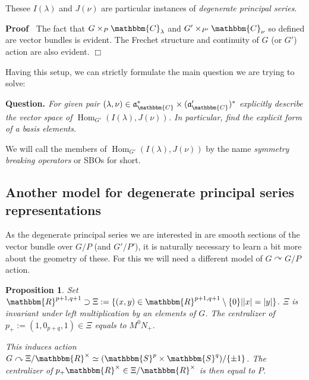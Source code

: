 \documentclass{article}
\newcommand{\assign}{:=}
\newcommand{\tmop}[1]{\ensuremath{\operatorname{#1}}}
\newcommand{\tmtextbf}[1]{{\bfseries{#1}}}
\newcommand{\tmtextit}[1]{{\itshape{#1}}}
\newenvironment{proof}{\noindent\textbf{Proof\ }}{\hspace*{\fill}$\Box$\medskip}
\numberwithin{definition}{section}
\numberwithin{lemma}{section}
\newtheorem{proposition}{Proposition}
\numberwithin{proposition}{section}
{\theorembodyfont{\rmfamily}\newtheorem{remark}{Remark}
\numberwithin{remark}{section}
}
\begin{document}
\begin{remark}
  Thesee $I ( \lambda)$ and $J ( \nu)$ are particular instances of
  \tmtextit{degenerate principal series}.
\end{remark}

\begin{proof}
  The fact that $G \times_P \mathbbm{C}_{\lambda}$ and $G' \times_{P'}
  \mathbbm{C}_{\nu}$ so defined are vector bundles is evident. The Frechet
  structure and continuity of $G$ (or $G'$) action are also evident.
\end{proof}

Having this setup, we can strictly formulate the main question we are trying
to solve:

{\noindent}\tmtextbf{Question. }\tmtextit{For given pair $( \lambda, \nu) \in
\mathfrak{a}_{\mathbbm{C}}^{\ast} \times (
\mathfrak{a}'_{\mathbbm{C}})^{\ast}$ explicitly describe the vector space of
$\tmop{Hom}_{G'} ( I ( \lambda), J ( \nu))$. In particular, find the explicit
form of a basis elements.}{\hspace*{\fill}}{\medskip}

\begin{remark}
  We will call the members of $\tmop{Hom}_{G'} ( I ( \lambda), J ( \nu))$ by
  the name \tmtextit{symmetry breaking operators} or SBOs for short.
\end{remark}

\subsection{Another model for degenerate principal series representations}

As the degenerate principal series we are interested in are smooth sections of
the vector bundle over $G / P$ (and $G' / P'$), it is naturally necessary to
learn a bit more about the geometry of these. For this we will need a
different model of $G \curvearrowright G / P$ action.

\begin{proposition}
  \label{def-n-nots:prop-ximodel}Set $\mathbbm{R}^{p + 1, q + 1} \supset \Xi
  \assign \{ (x, y) \in \mathbbm{R}^{p + 1, q + 1} \setminus \{ 0 \} | | x | =
  | y | \}$. $\Xi$ is invariant under left multiplication by an elements of
  $G$. The centralizer of $p_+ \assign ( 1, 0_{p + q}, 1) \in \Xi$ equals to
  $M_{}^0 N_+$.
  
  This induces action $G \curvearrowright \Xi /\mathbbm{R}^{\times} \simeq (
  \mathbbm{S}^p \times \mathbbm{S}^q) / \{ \pm 1 \}$. The centralizer of $p_+
  \mathbbm{R}^{\times} \in \Xi /\mathbbm{R}^{\times}$ is then equal to $P$.
\end{proposition}
\end{document}
